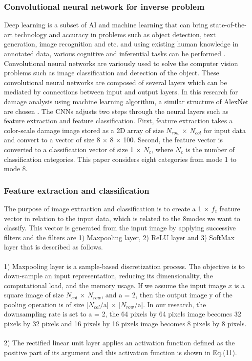 \subsubsection{Convolutional neural network for inverse problem}
\label{subsubsec3}
Deep learning is a subset of AI and machine learning that can bring state-of-the-art technology and accuracy in problems such as object detection, text generation, image recognition and etc. and using existing human knowledge in annotated data, various cognitive and inferential tasks can be performed \cite{Ref20,Ref21,Ref22}. Convolutional neural networks are variously used to solve the computer vision problems such as image classification and detection of the object. These convolutional neural networks are composed of several layers which can be mediated by connections between input and output layers. In this research for damage analysis using machine learning algorithm, a similar structure of AlexNet are chosen \cite{Ref23}. The CNNs adjusts two steps through the neural layers such as feature extraction and feature classification. First, feature extraction takes a color-scale damage image stored as a 2D array of size $N_{row}$ $\times$ $N_{col}$ for input data and convert to a vector of size 8 $\times$ 8 $\times$ 100. Second, the feature vector is converted to a classification vector of size 1 $\times$ $N_{c}$, where $N_{c}$ is the number of classification categories. This paper considers eight categories from mode 1 to mode 8.

\subsubsection{Feature extraction and classification}
\label{subsubsec3}
The purpose of image extraction and classification is to create a 1 $\times$ $f_c$ feature vector in relation to the input data, which is related to the 8modes we want to classify. This vector is generated from the input image by applying successive filters and the filters are 1) Maxpooling layer, 2) ReLU layer and 3) SoftMax layer that is  described as follows.
\\
\\
1) Maxpooling layer \cite{Ref24} is a sample-based discretization process. The objective is to down-sample an input representation, reducing its dimensionality, the computational load, and the memory usage. If we assume the input image $x$ is a square image of size $N_{col}$ $\times$ $N_{row}$, and a = 2, then the output image y of the pooling operation is of size [$N_{col}$/a] $\times$ [$N_{row}$/a]. In our research, the downsampling rate is set to a = 2,
the 64 pixels by 64 pixels image becomes 32 pixels by 32 pixels and 16 pixels by 16 pixels image becomes 8 pixels by 8 pixels.
\\
\\
2) The rectified linear unit layer \cite{Ref25} applies an activation function defined as the positive part of its argument and this activation function is shown in Eq.(11).

